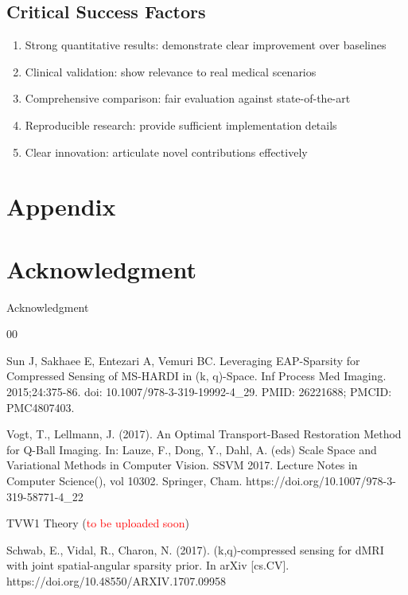 \documentclass[journal,twoside,web]{ieeecolor}
\begin{document}
\subsection{Critical Success Factors}
\begin{enumerate}
    \item Strong quantitative results: demonstrate clear improvement over baselines
    \item Clinical validation: show relevance to real medical scenarios
    \item Comprehensive comparison: fair evaluation against state-of-the-art
    \item Reproducible research: provide sufficient implementation details
    \item Clear innovation: articulate novel contributions effectively
\end{enumerate}


\appendices

\section*{Appendix}

\section*{Acknowledgment}
Acknowledgment


\begin{thebibliography}{00}

Sun J, Sakhaee E, Entezari A, Vemuri BC. Leveraging EAP-Sparsity for Compressed Sensing of MS-HARDI in (k, q)-Space. Inf Process Med Imaging. 2015;24:375-86. doi: 10.1007/978-3-319-19992-4\_29. PMID: 26221688; PMCID: PMC4807403.

Vogt, T., Lellmann, J. (2017). An Optimal Transport-Based Restoration Method for Q-Ball Imaging. In: Lauze, F., Dong, Y., Dahl, A. (eds) Scale Space and Variational Methods in Computer Vision. SSVM 2017. Lecture Notes in Computer Science(), vol 10302. Springer, Cham. https://doi.org/10.1007/978-3-319-58771-4\_22

TVW1 Theory (\textcolor{red}{to be uploaded soon})

Schwab, E., Vidal, R., Charon, N. (2017). (k,q)-compressed sensing for dMRI with joint spatial-angular sparsity prior. In arXiv [cs.CV]. https://doi.org/10.48550/ARXIV.1707.09958

\end{thebibliography}
\end{document}
